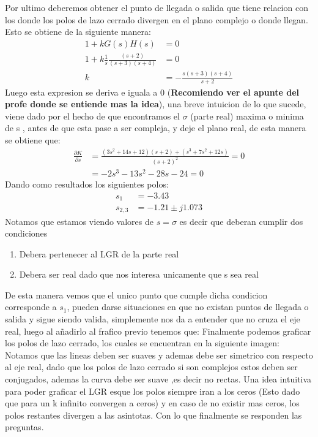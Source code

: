 \documentclass[
  11pt,
  letterpaper,
   addpoints,
   answers
  ]{exam}
\begin{document}
\begin{questions}
\begin{solution}
Por ultimo deberemos obtener el punto de llegada o salida que tiene relacion con los donde los polos de lazo cerrado divergen en el plano complejo o donde llegan. Esto se obtiene de la siguiente manera:
\begin{align}
    1+kG(s)H(s) &= 0\\
    1+k\frac{1}{s} \frac{(s+2)}{(s+3)(s+4)} &= 0\\
    k & = -\frac{s(s+3)(s+4)}{s+2}
\end{align}
Luego esta expresion se deriva e iguala a 0 (\textbf{Recomiendo ver el apunte del profe donde se entiende mas la idea}), una breve intuicion de lo que sucede, viene dado por el hecho de que encontramos el $\sigma$ (parte real) maxima o minima de s , antes de que esta pase a ser compleja, y deje el plano real, de esta manera se obtiene que:
\begin{align}
    \frac{\partial K}{\partial s} &= \frac{(3s^{2} +14s+12)(s+2) + (s^{3} + 7s^{2} +12s)}{(s+2)^{2}} = 0\\
    &=-2s^{3}-13s^{2}-28s-24=0
\end{align}
Dando como resultados los siguientes polos:
\begin{align}
    s_{1} &= -3.43\\
    s_{2,3}&= -1.21\pm j1.073 
\end{align}
Notamos que estamos viendo valores de $s=\sigma$ es decir que deberan cumplir dos condiciones
\begin{enumerate}
    \item Debera pertenecer al LGR de la parte real
    \item Debera ser real dado que nos interesa unicamente que s sea real
\end{enumerate}
De esta manera vemos que el unico punto que cumple dicha condicion corresponde a $s_{1}$, pueden darse situaciones en que no existan puntos de llegada o salida y sigue siendo valida, simplemente nos da a entender que no cruza el eje real, luego al añadirlo al frafico previo tenemos que:
Finalmente podemos graficar los polos de lazo cerrado, los cuales se encuentran en la siguiente imagen:
Notamos que las lineas deben ser suaves y ademas debe ser simetrico con respecto al eje real, dado que los polos de lazo cerrado si son complejos estos deben ser conjugados, ademas la curva debe ser suave ,es decir no rectas. Una idea intuitiva para poder graficar el LGR esque los polos siempre iran a los ceros (Esto dado que para un k infinito convergen a ceros) y en caso de no existir mas ceros, los polos restantes divergen a las asintotas. Con lo que finalmente se responden las preguntas.

\end{solution}
\end{questions}
\end{document}
